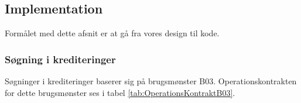 \subsection{Implementation}

Formålet med dette afsnit er at gå fra vores design til kode.

\subsubsection{Søgning i krediteringer}%
\label{ssub:sogning_i_krediteringer}

Søgninger i krediteringer baserer sig på brugsmønster B03. Operationskontrakten
for dette brugsmønster ses i tabel \ref{tab:OperationsKontraktB03}.

